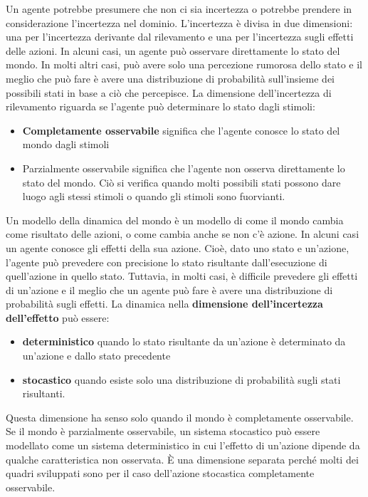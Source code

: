 \documentclass[a4paper]{extarticle}
\begin{document}
Un agente potrebbe presumere che non ci sia incertezza o potrebbe prendere in considerazione l'incertezza nel dominio. L'incertezza è divisa in due dimensioni: una per l'incertezza derivante dal rilevamento e una per l'incertezza sugli effetti delle azioni. In alcuni casi, un agente può osservare direttamente lo stato del mondo. In molti altri casi, può avere solo una percezione rumorosa dello stato e il meglio che può fare è avere una distribuzione di probabilità sull'insieme dei possibili stati in base a ciò che percepisce. La dimensione dell'incertezza di rilevamento riguarda se l'agente può determinare lo stato dagli stimoli:
\begin{itemize}
\item \textbf{Completamente osservabile} significa che l'agente conosce lo stato del mondo dagli stimoli
\item Parzialmente osservabile significa che l'agente non osserva direttamente lo stato del mondo. Ciò si verifica quando molti possibili stati possono dare luogo agli stessi stimoli o quando gli stimoli sono fuorvianti.
\end{itemize}

Un modello della dinamica del mondo è un modello di come il mondo cambia come risultato delle azioni, o come cambia anche se non c'è azione. In alcuni casi un agente conosce gli effetti della sua azione. Cioè, dato uno stato e un'azione, l'agente può prevedere con precisione lo stato risultante dall'esecuzione di quell'azione in quello stato. Tuttavia, in molti casi, è difficile prevedere gli effetti di un'azione e il meglio che un agente può fare è avere una distribuzione di probabilità sugli effetti. La dinamica nella \textbf{dimensione dell'incertezza dell'effetto} può essere:

\begin{itemize}
\item \textbf{deterministico} quando lo stato risultante da un'azione è determinato da un'azione e dallo stato precedente
\item \textbf{stocastico}  quando esiste solo una distribuzione di probabilità sugli stati risultanti.
\end{itemize}

Questa dimensione ha senso solo quando il mondo è completamente osservabile. Se il mondo è parzialmente osservabile, un sistema stocastico può essere modellato come un sistema deterministico in cui l'effetto di un'azione dipende da qualche caratteristica non osservata. È una dimensione separata perché molti dei quadri sviluppati sono per il caso dell'azione stocastica completamente osservabile.
\end{document}
